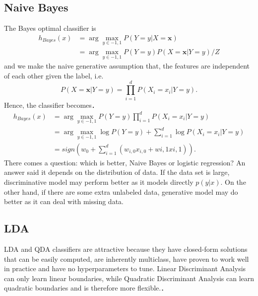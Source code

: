 \documentclass{article}
\begin{document}
   \subsection{Naive Bayes}
   The Bayes optimal classifier is 
   \begin{align}
   h_{Bayes}(x) &= \arg\max_{y \in {-1, 1}} P(Y=y|X=\textbf{x}) \\
   				&= \arg\max_{y \in {-1, 1}} P(Y=y)P(X=\textbf{x}|Y=y)/Z
   \end{align}
   and we make the naive generative assumption that, the features are independent of each other given the label, i.e.
   \begin{equation}
   P(X=\textbf{x}|Y=y) = \prod_{i=1}^d P(X_i=x_i|Y=y).
   \end{equation}
   Hence, the classifier becomes．
   \begin{align}
   h_{Bayes}(x) &= \arg\max_{y \in {-1, 1}} P(Y=y) \prod_{i=1}^d P(X_i=x_i|Y=y) \\
   &= \arg\max_{y \in {-1, 1}} \log P(Y=y) + \sum_{i=1}^d \log P(X_i=x_i|Y=y) \\
   &= sign(w_0 + \sum_{i=1}^d(w_{i,0}x_{i,0}+w{i,1}x{i,1})).
   \end{align}
   There comes a question: which is better, Naive Bayes or logistic regression? An answer \cite{4690} said it depends on the distribution of data. If the data set is large, discriminative model may perform better as it models directly $p(y|x)$. On the other hand, if there are some extra unlabeled data, generative model may do better as it can deal with missing data.
   
   \subsection{LDA}
   LDA and QDA classifiers are attractive because they have closed-form solutions that can be easily computed, are inherently multiclass, have proven to work well in practice and have no hyperparameters to tune. Linear Discriminant Analysis can only learn linear boundaries, while Quadratic Discriminant Analysis can learn quadratic boundaries and is therefore more flexible.．
   
\end{document}
